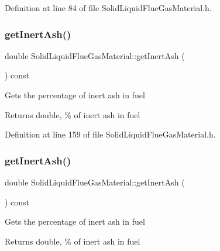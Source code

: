 Definition at line 84 of file Solid\+Liquid\+Flue\+Gas\+Material.\+h.

\mbox{\label{class_solid_liquid_flue_gas_material_a0549b32b7b5423267d5f59cc96b98127}} 
\subsubsection{\texorpdfstring{get\+Inert\+Ash()}{getInertAsh()}\hspace{0.1cm}{\footnotesize\ttfamily [1/3]}}
{\footnotesize\ttfamily double Solid\+Liquid\+Flue\+Gas\+Material\+::get\+Inert\+Ash (\begin{DoxyParamCaption}{ }\end{DoxyParamCaption}) const\hspace{0.3cm}{\ttfamily [inline]}}

Gets the percentage of inert ash in fuel \begin{DoxyReturn}{Returns}
double, \% of inert ash in fuel 
\end{DoxyReturn}


Definition at line 159 of file Solid\+Liquid\+Flue\+Gas\+Material.\+h.

\mbox{\label{class_solid_liquid_flue_gas_material_a0549b32b7b5423267d5f59cc96b98127}} 
\subsubsection{\texorpdfstring{get\+Inert\+Ash()}{getInertAsh()}\hspace{0.1cm}{\footnotesize\ttfamily [2/3]}}
{\footnotesize\ttfamily double Solid\+Liquid\+Flue\+Gas\+Material\+::get\+Inert\+Ash (\begin{DoxyParamCaption}{ }\end{DoxyParamCaption}) const\hspace{0.3cm}{\ttfamily [inline]}}

Gets the percentage of inert ash in fuel \begin{DoxyReturn}{Returns}
double, \% of inert ash in fuel 
\end{DoxyReturn}


